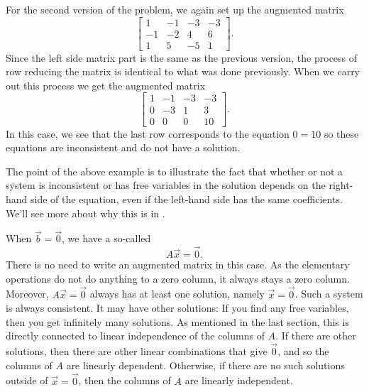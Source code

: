 \begin{exampleSol}
For the second version of the problem, we again set up the augmented matrix
\begin{equation*}
\left[ 
\begin{array}{ccc|c}
1 & -1 & -3 & -3 \\
-1 & -2 & 4 & 6 \\
1 & 5 & -5 & 1
\end{array}
\right].
\end{equation*}
Since the left side matrix part is the same as the previous version, the process of row reducing the matrix is identical to what was done previously. When we carry out this process we get the augmented matrix
\begin{equation*}
\left[ 
\begin{array}{ccc|c}
1 & -1 & -3 & -3 \\
0 & -3 & 1 & 3 \\
0 & 0 & 0 & 10
\end{array}
\right].
\end{equation*}
In this case, we see that the last row corresponds to the equation $0 = 10$ so these equations are inconsistent and do not have a solution.
\end{exampleSol}
The point of the above example is to illustrate the fact that whether or not a system is inconsistent or has free variables in the solution depends on the right-hand side of the equation, even if the left-hand side has the same coefficients. We'll see more about why this is in .
\medskip

When $\vec{b} = \vec{0}$, we have a so-called
\emph{}
\begin{equation*}
A \vec{x} = \vec{0} .
\end{equation*}
There is no need to write an augmented matrix in this
case.  As the elementary operations do not do anything to a zero column, it
always stays a zero column.  Moreover, $A \vec{x} = \vec{0}$ always has at
least one solution, namely $\vec{x} = \vec{0}$.  Such a system
is always consistent.  It may have other solutions:  If you find
any free variables, then you get infinitely many solutions. As mentioned in the last section, this is directly connected to linear independence of the columns of $A$. If there are other solutions, then there are other linear combinations that give $\vec{0}$, and so the columns of $A$ are linearly dependent. Otherwise, if there are no such solutions outside of $\vec{x} = \vec{0}$, then the columns of $A$ are linearly independent.

